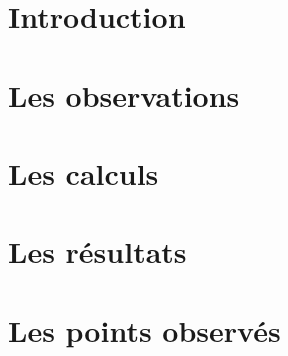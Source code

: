 \documentclass[french]{report}
\begin{document}


%

%

%

%

\tableofcontents


\chapter{Introduction}


\chapter{Les observations}


\chapter{Les calculs}


\chapter{Les résultats}


%

\appendix
\chapter{Les points observés}

%


\listoffigures
\end{document}
